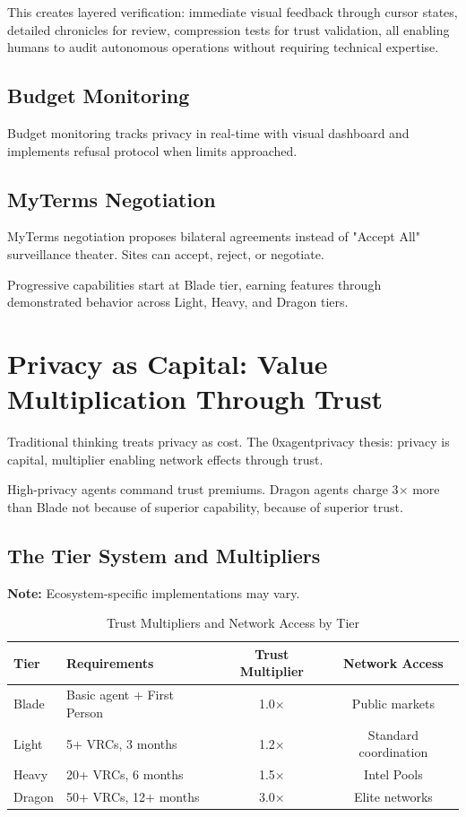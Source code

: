 \documentclass[11pt,a4paper]{article}
\theoremstyle{definition}
\begin{document}
This creates layered verification: immediate visual feedback through cursor states, detailed chronicles for review, compression tests for trust validation, all enabling humans to audit autonomous operations without requiring technical expertise.

\subsection{Budget Monitoring}

Budget monitoring tracks privacy in real-time with visual dashboard and implements refusal protocol when limits approached.

\subsection{MyTerms Negotiation}

MyTerms negotiation proposes bilateral agreements instead of "Accept All" surveillance theater. Sites can accept, reject, or negotiate.

Progressive capabilities start at Blade tier, earning features through demonstrated behavior across Light, Heavy, and Dragon tiers.

\section{Privacy as Capital: Value Multiplication Through Trust}

Traditional thinking treats privacy as cost. The 0xagentprivacy thesis: privacy is capital, multiplier enabling network effects through trust.

High-privacy agents command trust premiums. Dragon agents charge 3$\times$ more than Blade not because of superior capability, because of superior trust.

\subsection{The Tier System and Multipliers}

\textbf{Note:} Ecosystem-specific implementations may vary.

\begin{table}[h]
\centering
\caption{Trust Multipliers and Network Access by Tier}
\begin{tabularx}{\textwidth}{lXcc}
\toprule
\textbf{Tier} & \textbf{Requirements} & \textbf{Trust Multiplier} & \textbf{Network Access} \\
\midrule
Blade & Basic agent + First Person & 1.0$\times$ & Public markets \\
Light & 5+ VRCs, 3 months & 1.2$\times$ & Standard coordination \\
Heavy & 20+ VRCs, 6 months & 1.5$\times$ & Intel Pools \\
Dragon & 50+ VRCs, 12+ months & 3.0$\times$ & Elite networks \\
\bottomrule
\end{tabularx}
\end{table}
\end{document}
